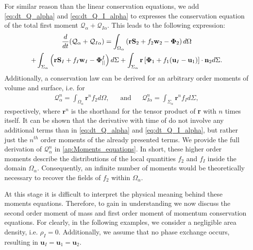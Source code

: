 For similar reason than the linear conservation equations, we add \ref{eq:dt_Q_alpha} and \ref{eq:dt_Q_I_alpha} to expresses the conservation equation of the total first moment $\mathcal{Q}_\alpha + \mathcal{Q}_{I\alpha}$.
This leads to the following expression:
\begin{multline}
    \frac{d}{d t} (\mathcal{Q}_\alpha+\mathcal{Q}_{I\alpha})
    = \int_{\Omega_\alpha} \left(
        \textbf{r} \textbf{S}_2         
        + f_2  \textbf{w}_2 
        - \mathbf{\Phi}_2
    \right) d\Omega\\
    + \int_{\Sigma_\alpha} \left(
        \textbf{r}\textbf{S}_I
        + f_I \textbf{w}_I
        - \mathbf{\Phi}_{||}^I
    \right) d\Sigma
    + \int_{\Sigma_\alpha} \textbf{r} \left[
        \mathbf{\Phi}_1
        + f_1 (\textbf{u}_I-\textbf{u}_1)
    \right]\cdot \textbf{n}_2  d\Sigma.
    \label{eq:dt_Q_tot}
\end{multline}
Additionally, a conservation law can be derived for an arbitrary order moments of volume and surface, i.e. for
\begin{align}
    \mathcal{Q}_\alpha^n
    = \int_{\Omega_\alpha}
        \textbf{r}^n
        f_2 d\Omega,
        && \text{and} &&
    \mathcal{Q}_{I\alpha}^n
    = \int_{\Sigma_\alpha}
        \textbf{r}^n
    f_I d\Sigma,
    \label{eq:Q_n_definition}
\end{align} 
respectively, where $\textbf{r}^n$ is the shorthand for the tensor product of \textbf{r} with $n$ times itself. 
It can be shown that the derivative with time of do not involve any additional terms than in \ref{eq:dt_Q_alpha} and \ref{eq:dt_Q_I_alpha}, but rather just the $n^{th}$ order moments of the already presented terms.
We provide the full derivation of $\mathcal{Q}_\alpha^n$ in \ref{ap:Moments_equations}.
In short, these higher order moments describe the distributions of the local quantities $f_2$ and $f_I$ inside the domain $\Omega_\alpha$.
Consequently, an infinite number of moments would be theoretically necessary to recover the fields of $f_2$ within $\Omega_\alpha$. 


At this stage it is difficult to interpret the physical meaning behind these moments equations. 
Therefore, to gain in understanding we now discuss the second order moment of mass and first order moment of momentum conservation equations. 
For clearly, in the following examples, we consider a negligible area density, i.e. $\rho_I=0$. 
Additionally, we assume that no phase exchange occurs, resulting in $\textbf{u}_I=\textbf{u}_1=\textbf{u}_2$. 

